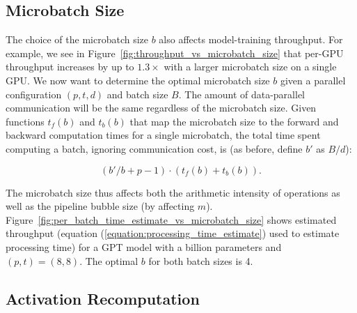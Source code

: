 
\subsection{Microbatch Size}
\label{sec:microbatch_size_analytical_model}

The choice of the microbatch size $b$ also affects model-training throughput. For example, we see in Figure~\ref{fig:throughput_vs_microbatch_size} that per-GPU throughput increases by up to $1.3\times$ with a larger microbatch size on a single GPU. We now want to determine the optimal microbatch size $b$ given a parallel configuration $(p, t, d)$ and batch size $B$. The amount of data-parallel communication will be the same regardless of the microbatch size. Given functions $t_f(b)$ and $t_b(b)$ that map the microbatch size to the forward and backward computation times for a single microbatch, the total time spent computing a batch, ignoring communication cost, is (as before, define $b'$ as $B/d$):

\begin{equation}
    \left(b' / b + p - 1\right) \cdot \left(t_f(b) + t_b(b)\right). \label{equation:processing_time_estimate}
\end{equation}

The microbatch size thus affects both the arithmetic intensity of operations as well as the pipeline bubble size (by affecting $m$). Figure~\ref{fig:per_batch_time_estimate_vs_microbatch_size} shows estimated throughput (equation (\ref{equation:processing_time_estimate}) used to estimate processing time) for a GPT model with a billion parameters and $(p, t) = (8, 8)$. The optimal $b$ for both batch sizes is 4.


\subsection{Activation Recomputation}

